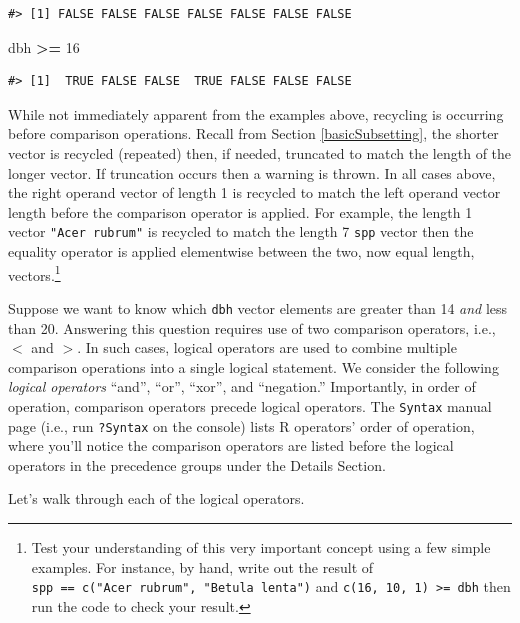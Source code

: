 \documentclass[
  11pt,
]{krantz}
\newenvironment{Shaded}{\begin{snugshade}}{\end{snugshade}}
\newcommand{\DecValTok}[1]{\textcolor[rgb]{0.00,0.00,0.81}{#1}}
\newcommand{\NormalTok}[1]{#1}
\newcommand{\OperatorTok}[1]{\textcolor[rgb]{0.81,0.36,0.00}{\textbf{#1}}}
\newcommand{\StringTok}[1]{\textcolor[rgb]{0.31,0.60,0.02}{#1}}
\theoremstyle{definition}
\theoremstyle{definition}
\theoremstyle{definition}
\theoremstyle{definition}
\theoremstyle{remark}
\begin{document}
\begin{enumerate}
\begin{verbatim}
#> [1] FALSE FALSE FALSE FALSE FALSE FALSE FALSE
\end{verbatim}

\begin{Shaded}
\begin{Highlighting}[]
\NormalTok{dbh }\OperatorTok{\textgreater{}=}\StringTok{ }\DecValTok{16}
\end{Highlighting}
\end{Shaded}

\begin{verbatim}
#> [1]  TRUE FALSE FALSE  TRUE FALSE FALSE FALSE
\end{verbatim}
\end{enumerate}

While not immediately apparent from the examples above, recycling is occurring before comparison operations. Recall from Section \ref{basicSubsetting}, the shorter vector is recycled (repeated) then, if needed, truncated to match the length of the longer vector. If truncation occurs then a warning is thrown. In all cases above, the right operand vector of length 1 is recycled to match the left operand vector length before the comparison operator is applied. For example, the length 1 vector \texttt{"Acer\ rubrum"} is recycled to match the length 7 \texttt{spp} vector then the equality operator is applied elementwise between the two, now equal length, vectors.\footnote{Test your understanding of this very important concept using a few simple examples. For instance, by hand, write out the result of \texttt{spp\ ==\ c("Acer\ rubrum",\ "Betula\ lenta")} and \texttt{c(16,\ 10,\ 1)\ \textgreater{}=\ dbh} then run the code to check your result.}

Suppose we want to know which \texttt{dbh} vector elements are greater than 14 \emph{and} less than 20. Answering this question requires use of two comparison operators, i.e., \(<\) and \(>\). In such cases, logical operators are used to combine multiple comparison operations into a single logical statement. We consider the following \emph{logical operators} ``and'', ``or'', ``xor'', and ``negation.''
Importantly, in order of operation, comparison operators precede logical operators. The \texttt{Syntax} manual page (i.e., run \texttt{?Syntax} on the console) lists R operators' order of operation, where you'll notice the comparison operators are listed before the logical operators in the precedence groups under the Details Section.

Let's walk through each of the logical operators.
\end{document}
